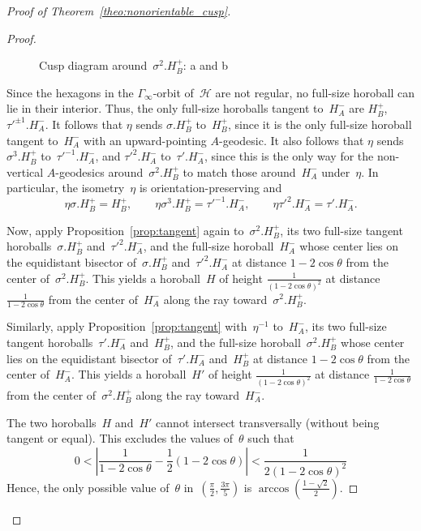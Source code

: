 \documentclass[11pt,reqno]{amsart}
\theoremstyle{definition}
\numberwithin{equation}{section}
\numberwithin{equation}{section}
\begin{document}
\begin{proof}[Proof of Theorem~\ref{theo:nonorientable_cusp}]
\begin{proof}
\begin{figure}[htbp!]
\centering
\vspace*{0.7cm}
\hspace*{-0.5cm}
\def\svgwidth{0.75\textheight}

\caption{Cusp diagram around~$\sigma^2.H_B^+$: a and b} \label{fig:777}
\end{figure}


Since the hexagons in the $\Gamma_\infty$-orbit of~$\mathcal{H}$ are not regular, no full-size horoball can lie in their interior. 
Thus, the only full-size horoballs tangent to~$H_A^-$ are $H_B^+$, $\tau'^{\pm 1}.H_A^-$.
It follows that $\eta$ sends $\sigma.H_B^+$ to~$H_B^+$, since it is the only full-size horoball tangent to~$H_A^-$ with an upward-pointing $A$-geodesic.
It also follows that $\eta$ sends $\sigma^3.H_B^+$ to~$\tau'^{-1}.H_A^-$, and $\tau'^2.H_A^-$ to~$\tau'.H_A^-$, since this is the only way for the non-vertical $A$-geodesics around~$\sigma^2.H_B^+$ to match those around~$H_A^-$ under~$\eta$.
In particular, the isometry~$\eta$ is orientation-preserving and
\[
\eta \sigma.H_B^+=H_B^+, \qquad \eta \sigma^3.H_B^+ = \tau'^{-1}.H_A^-, \qquad \eta \tau'^2 . H_A^- = \tau' . H_A^-.
\]

Now, apply Proposition~\ref{prop:tangent} again to~$\sigma^2.H_B^+$, its two full-size tangent horoballs~$\sigma.H_B^+$ and~$\tau'^2.H_A^-$, and the full-size horoball~$H_A^-$ whose center lies on the equidistant bisector of~$\sigma.H_B^+$ and~$\tau'^2.H_A^-$ at distance $1-2 \cos \theta$ from the center of~$\sigma^2.H_B^+$.
This yields a horoball~$H$ of height $\frac{1}{(1-2 \cos \theta)^2}$ at distance $\frac{1}{1-2 \cos \theta}$ from the center of~$H_A^-$ along the ray toward~$\sigma^2.H_B^+$.

Similarly, apply Proposition~\ref{prop:tangent} with~$\eta^{-1}$ to~$H_A^-$, its two full-size tangent horoballs~$\tau'.H_A^-$ and~$H_B^+$, and the full-size horoball~$\sigma^2.H_B^+$ whose center lies on the equidistant bisector of~$\tau'.H_A^-$ and~$H_B^+$ at distance $1-2 \cos \theta$ from the center of~$H_A^-$.
This yields a horoball~$H'$ of height $\frac{1}{(1-2 \cos \theta)^2}$ at distance $\frac{1}{1-2 \cos \theta}$ from the center of~$\sigma^2.H_B^+$ along the ray toward~$H_A^-$.

The two horoballs~$H$ and~$H'$ cannot intersect transversally (without being tangent or equal).
This excludes the values of~$\theta$ such that
\[
0 < \left| \frac{1}{1-2 \cos \theta}  - \frac{1}{2} (1-2 \cos \theta) \right|< \frac{1}{2(1-2 \cos \theta)^2} 
\]
Hence, the only possible value of~$\theta$ in~$(\frac{\pi}{2},\frac{3\pi}{5})$ is $\arccos\left( \frac{1-\sqrt{2}}{2} \right)$.
\end{proof}


\end{proof}
\end{document}
